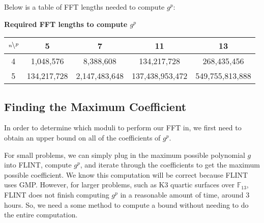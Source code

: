 Below is a table of FFT lengths needed to compute $g^p$:


\begin{center}
    \textbf{Required FFT lengths to compute $g^p$}
    \begin{tabular}{c|c|c|c|c}
    $\bsfrac{\,p}{n}$ & 5 & 7 & 11 & 13 \\ \hline
    4 & 1,048,576 & 8,388,608 & 134,217,728 & 268,435,456 \\
    5 & 134,217,728 & 2,147,483,648 & 137,438,953,472 & 549,755,813,888
    \end{tabular}
\end{center}    







\subsection{Finding the Maximum Coefficient}
In order to determine which moduli to perform our FFT in, we first need to obtain an upper bound on all of 
the coefficients of $g ^ p$.

For small problems, we can simply plug in the maximum possible polynomial $g$ into FLINT, compute $g ^ p$, and iterate through the coefficients to get the maximum possible coefficient.
We know this computation will be correct because FLINT uses GMP. However, for larger problems, such as K3 quartic surfaces over $\mathbb{F}_{13}$, FLINT does not finish computing $g ^ p$ in a reasonable amount of time, around 3 hours. So, we need a some method to compute a bound without needing to do the entire computation.

